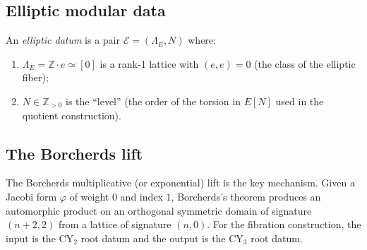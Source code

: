 \subsection{Elliptic modular data}
\label{ssec:elliptic-data}

\begin{definition}
\label{def:elliptic-datum}
An \emph{elliptic datum} is a pair $\mathcal{E} = (\Lambda_E, N)$ where:
\begin{enumerate}[label=(\roman*)]
 \item $\Lambda_E = \mathbb{Z} \cdot e \simeq [0]$ is a rank-1 lattice with $(e, e) = 0$ (the class of the elliptic fiber);
 \item $N \in \mathbb{Z}_{>0}$ is the ``level'' (the order of the torsion in $E[N]$ used in the quotient construction).
\end{enumerate}
\end{definition}

\subsection{The Borcherds lift}
\label{ssec:borcherds-lift}

The Borcherds multiplicative (or exponential) lift is the key mechanism. Given a Jacobi form $\varphi$ of weight $0$ and index $1$, Borcherds's theorem produces an automorphic product on an orthogonal symmetric domain of signature $(n+2, 2)$ from a lattice of signature $(n, 0)$. For the fibration construction, the input is the CY$_2$ root datum and the output is the CY$_3$ root datum.

